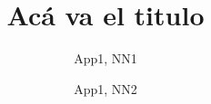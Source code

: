 \documentclass[12pt,a4paper,twosides,openright]{report}
\title{Acá va el titulo}
\author{App1, NN1 \and App1, NN2}
\begin{document}
		\renewcommand{\tablename}{Tabla}

		

		

		\tableofcontents

		
\end{document}
